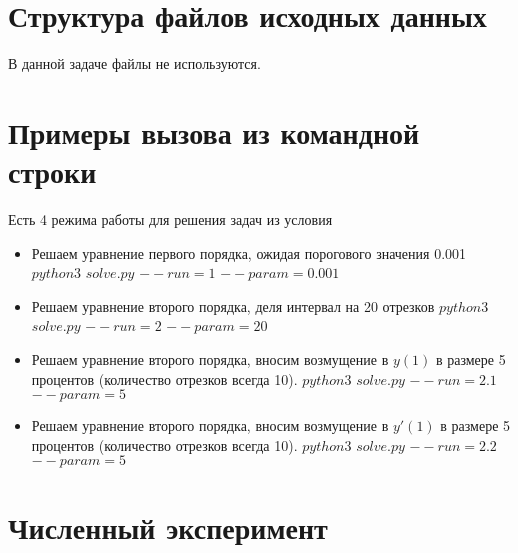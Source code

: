 \documentclass[paper=a4, fontsize=11pt]{scrartcl} %
\numberwithin{equation}{section} %
\numberwithin{figure}{section} %
\numberwithin{table}{section} %
\begin{document}

\section{Структура файлов исходных данных}

В данной задаче файлы не используются.


\section{Примеры вызова из командной строки}

Есть 4 режима работы для решения задач из условия

\begin{itemize}
	\item Решаем уравнение первого порядка, ожидая порогового значения 0.001
	\subitem $python3$ $solve.py$ $--run=1$ $--param=0.001$
    \item Решаем уравнение второго порядка, деля интервал на 20 отрезков
	\subitem $python3$ $solve.py$ $--run=2$ $--param=20$
    \item Решаем уравнение второго порядка, вносим возмущение в $y(1)$ в размере 5 процентов (количество отрезков всегда 10).
	\subitem $python3$ $solve.py$ $--run=2.1$ $--param=5$
    \item Решаем уравнение второго порядка, вносим возмущение в $y'(1)$ в размере 5 процентов (количество отрезков всегда 10).
	\subitem $python3$ $solve.py$ $--run=2.2$ $--param=5$
    
\end{itemize}



\section{Численный эксперимент}
\end{document}
